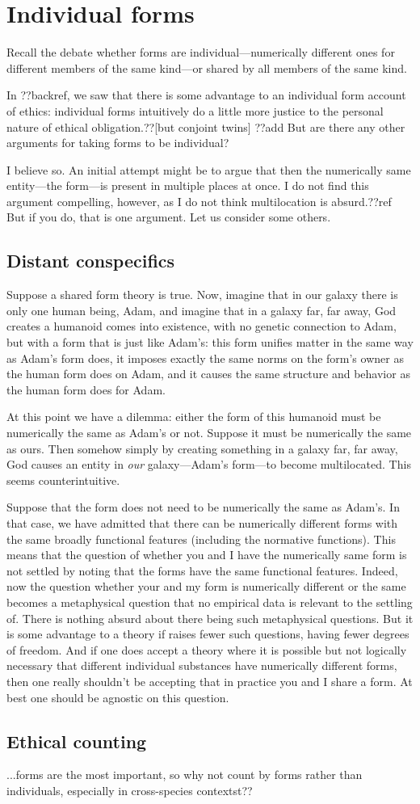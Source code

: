 \section{Individual forms}
Recall the debate whether forms are individual---numerically different ones for different members of the same kind---or shared
by all members of the same kind.

In ??backref, we saw that there is some advantage to an individual form account of ethics: individual forms intuitively do 
a little more justice to the personal nature of ethical obligation.??[but conjoint twins] ??add 
But are there any other arguments for taking forms to be individual?

I believe so. An initial attempt might be to argue that then the numerically same entity---the form---is present in multiple
places at once. I do not find this argument compelling, however, as I do not think multilocation is absurd.??ref But if you
do, that is one argument. Let us consider some others.

\subsection{Distant conspecifics}
Suppose a shared form theory is true. Now, imagine that in our galaxy there is only one human being, Adam, and imagine that in 
a galaxy far, far away, God creates a humanoid comes into existence, with no genetic connection to Adam, but with a form that 
is just like Adam's: this form unifies matter in the same way as
Adam's form does, it imposes exactly the same norms on the form's owner as the human form does on Adam, and it causes the same
structure and behavior as the human form does for Adam. 

At this point we have a dilemma: either the form of this humanoid must be numerically the same as Adam's or not. Suppose it 
must be numerically the same as ours. Then somehow simply by creating something in a galaxy far, far away, God causes an
entity in \textit{our} galaxy---Adam's form---to become multilocated. This seems counterintuitive. 

Suppose that the form does not need to be numerically the same as Adam's. In that case, we have admitted that there can 
be numerically different forms with the same broadly functional features (including the normative functions). This 
means that the question of whether you and I have the  numerically same form is not settled by noting that the forms have 
the same functional features. Indeed, now the question whether your and my form is numerically different or the same becomes
a metaphysical question that no empirical data is relevant to the settling of. There is nothing absurd about there being
such metaphysical questions. But it is some advantage to a theory if raises fewer such questions, having fewer degrees of 
freedom. And if one does accept a theory where it is possible but not logically necessary that different individual substances
have numerically different forms, then one really shouldn't be accepting that in practice you and I share a form. At best
one should be agnostic on this question.

\subsection{Ethical counting}
...forms are the most important, so why not count by forms rather than individuals, especially in cross-species contextst??

\chaptertail
